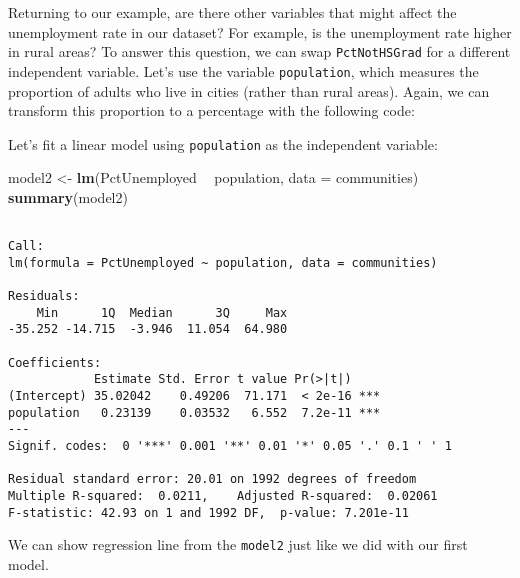 \documentclass[]{article}
\newenvironment{Shaded}{\begin{snugshade}}{\end{snugshade}}
\newcommand{\DataTypeTok}[1]{\textcolor[rgb]{0.13,0.29,0.53}{#1}}
\newcommand{\DecValTok}[1]{\textcolor[rgb]{0.00,0.00,0.81}{#1}}
\newcommand{\KeywordTok}[1]{\textcolor[rgb]{0.13,0.29,0.53}{\textbf{#1}}}
\newcommand{\NormalTok}[1]{#1}
\newcommand{\OperatorTok}[1]{\textcolor[rgb]{0.81,0.36,0.00}{\textbf{#1}}}
\newcommand{\StringTok}[1]{\textcolor[rgb]{0.31,0.60,0.02}{#1}}
\begin{document}
Returning to our example, are there other variables that might affect the unemployment rate in our dataset? For example, is the unemployment rate higher in rural areas? To answer this question, we can swap \texttt{PctNotHSGrad} for a different independent variable. Let's use the variable \texttt{population}, which measures the proportion of adults who live in cities (rather than rural areas). Again, we can transform this proportion to a percentage with the following code:

\begin{Shaded}
\end{Shaded}

Let's fit a linear model using \texttt{population} as the independent variable:

\begin{Shaded}
\begin{Highlighting}[]
\NormalTok{model2 <-}\StringTok{ }\KeywordTok{lm}\NormalTok{(PctUnemployed }\OperatorTok{~}\StringTok{ }\NormalTok{population, }\DataTypeTok{data =}\NormalTok{ communities)}
\KeywordTok{summary}\NormalTok{(model2)}
\end{Highlighting}
\end{Shaded}

\begin{verbatim}

Call:
lm(formula = PctUnemployed ~ population, data = communities)

Residuals:
    Min      1Q  Median      3Q     Max 
-35.252 -14.715  -3.946  11.054  64.980 

Coefficients:
            Estimate Std. Error t value Pr(>|t|)    
(Intercept) 35.02042    0.49206  71.171  < 2e-16 ***
population   0.23139    0.03532   6.552  7.2e-11 ***
---
Signif. codes:  0 '***' 0.001 '**' 0.01 '*' 0.05 '.' 0.1 ' ' 1

Residual standard error: 20.01 on 1992 degrees of freedom
Multiple R-squared:  0.0211,    Adjusted R-squared:  0.02061 
F-statistic: 42.93 on 1 and 1992 DF,  p-value: 7.201e-11
\end{verbatim}

We can show regression line from the \texttt{model2} just like we did with our first model.
\end{document}
